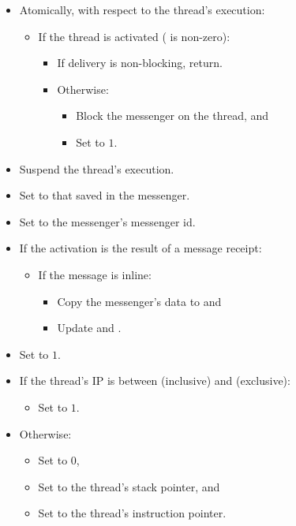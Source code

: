 \begin{itemize}
\item Atomically, with respect to the thread's execution:
  \begin{itemize}
  \item If the thread is activated ( is non-zero):
    \begin{itemize}
    \item If delivery is non-blocking, return.
    \item Otherwise:
      \begin{itemize}
      \item Block the messenger on the thread, and
      \item Set  to $1$.
      \end{itemize}
    \end{itemize}
  \end{itemize}

\item Suspend the thread's execution.

\item Set  to that saved in the messenger.
\item Set  to the messenger's messenger id.

\item If the activation is the result of a message receipt:
  \begin{itemize}
  \item If the message is inline:
    \begin{itemize}
    \item Copy the messenger's data to  and
    \item Update  and .
    \end{itemize}
  \end{itemize}

\item Set  to $1$.

\item If the thread's IP is between 
  (inclusive) and  (exclusive):
  \begin{itemize}
  \item Set  to $1$.
  \end{itemize}
\item Otherwise:
  \begin{itemize}
  \item Set  to $0$,
  \item Set  to the thread's stack pointer, and
  \item Set  to the thread's instruction pointer.
  \end{itemize}


\end{itemize}
